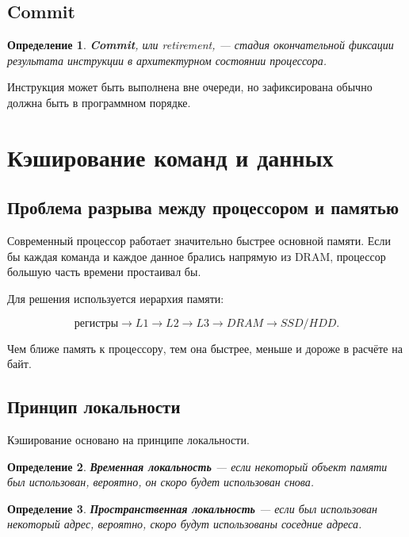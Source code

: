 \documentclass[12pt,a4paper]{article}
\newtheorem{definition}{Определение}
\begin{document}
\subsection{Commit}

\begin{definition}
\textbf{Commit}, или retirement, --- стадия окончательной фиксации результата инструкции в архитектурном состоянии процессора.
\end{definition}

Инструкция может быть выполнена вне очереди, но зафиксирована обычно должна быть в программном порядке.

\section{Кэширование команд и данных}

\subsection{Проблема разрыва между процессором и памятью}

Современный процессор работает значительно быстрее основной памяти. Если бы каждая команда и каждое данное брались напрямую из DRAM, процессор большую часть времени простаивал бы.

Для решения используется иерархия памяти:

\[
\text{регистры}
\rightarrow
L1
\rightarrow
L2
\rightarrow
L3
\rightarrow
DRAM
\rightarrow
SSD/HDD.
\]

Чем ближе память к процессору, тем она быстрее, меньше и дороже в расчёте на байт.

\subsection{Принцип локальности}

Кэширование основано на принципе локальности.

\begin{definition}
\textbf{Временная локальность} --- если некоторый объект памяти был использован, вероятно, он скоро будет использован снова.
\end{definition}

\begin{definition}
\textbf{Пространственная локальность} --- если был использован некоторый адрес, вероятно, скоро будут использованы соседние адреса.
\end{definition}
\end{document}
